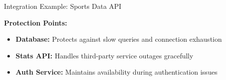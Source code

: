 \documentclass[aspectratio=169]{beamer}
\newcommand{\circuitopen}{\textcolor{red}{\faTimesCircle}}
\newcommand{\circuitclosed}{\textcolor{green}{\faCheckCircle}}
\begin{document}
\begin{frame}{Integration Example: Sports Data API}
\begin{center}
    \end{center}
    
    \textbf{Protection Points:}
    \begin{itemize}
        \item \textbf{Database:} Protects against slow queries and connection exhaustion
        \item \textbf{Stats API:} Handles third-party service outages gracefully
        \item \textbf{Auth Service:} Maintains availability during authentication issues
    \end{itemize}
\end{frame}
\end{document}
